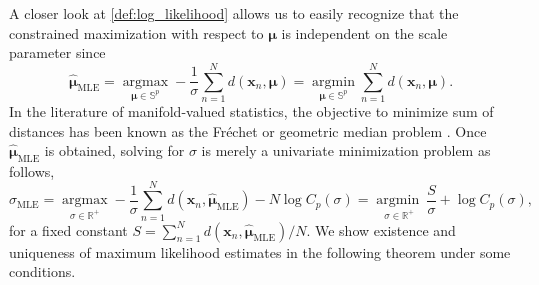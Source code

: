 \documentclass[10pt]{article}
\DeclareMathOperator*{\argmin}{argmin}
\DeclareMathOperator*{\argmax}{argmax}
\newcommand{\bfx}{\mathbf{x}}
\newcommand{\bfmu}{\boldsymbol{\mu}}
\newcommand{\bbS}{\mathbb{S}}
\newcommand{\bbRpos}{\mathbb{R}^+}
\newcommand{\mleloc}{\hat{\bfmu}_{\textrm{MLE}}}
\newcommand{\mlescale}{\hat{\sigma}_{\textrm{MLE}}}
\newcommand{\Frechet}{Fr\'{e}chet }
\begin{document}
A closer look at \eqref{def:log_likelihood} allows us to easily recognize that the constrained maximization with respect to $\bfmu$ is independent on the scale parameter since
\begin{equation}\label{eq:mle_location}
\mleloc = \underset{\bfmu \in \bbS^p}{\argmax} -\frac{1}{\sigma}\sum_{n=1}^N d(\bfx_n, \bfmu) = \underset{\bfmu \in \bbS^p}{\argmin} \sum_{n=1}^N d(\bfx_n, \bfmu).
\end{equation}
In the literature of manifold-valued statistics, the objective to minimize sum of distances has been known as the \Frechet or geometric median problem \cite{fletcher_2009_GeometricMedianRiemannian, arnaudon_2013_MediansMeansRiemannian}. Once $\mleloc$ is obtained, solving for $\sigma$ is merely a univariate minimization problem as follows,
\begin{equation}\label{eq:mle_scale}
\mlescale = \underset{\sigma\in\bbRpos}{\argmax} -\frac{1}{\sigma} \sum_{n=1}^N d(\bfx_n, \mleloc) - N \log C_p (\sigma) = \underset{\sigma\in\bbRpos}{\argmin~} \frac{S}{\sigma} + \log C_p(\sigma),
\end{equation}
for a fixed constant $S = \sum_{n=1}^N d(\bfx_n, \mleloc)/N$. We show existence and uniqueness of maximum likelihood estimates in the following theorem under some conditions.
\end{document}
